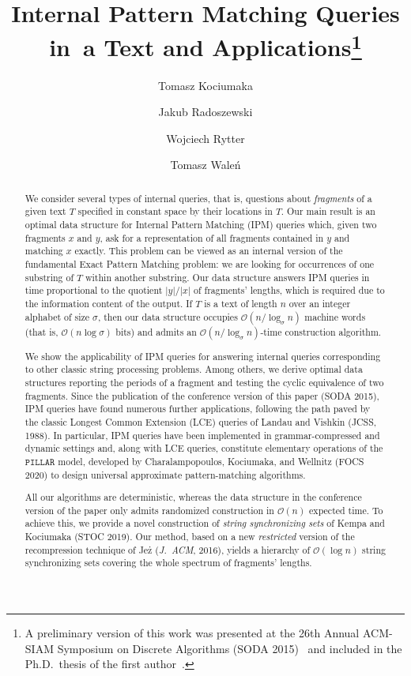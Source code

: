 \documentclass[a4paper]{article}
\title{Internal Pattern Matching Queries in~a Text and Applications\thanks{A preliminary version of this work was presented at the 26th Annual {ACM-SIAM} Symposium on Discrete Algorithms (SODA 2015)~\cite{DBLP:conf/soda/KociumakaRRW15} and included in the Ph.D.\ thesis of the first author~\cite{phd}.}}
\author[1]{Tomasz Kociumaka}
\author[2,3]{Jakub Radoszewski}
\author[2]{Wojciech Rytter}
\author[2]{Tomasz Wale\'n}
\affil[1]{Max Planck Institute for Informatics,  Saarbrücken, Germany}
\affil[ ]{\texttt{tomasz.kociumaka@mpi-inf.mpg.de}}
\affil[2]{University of Warsaw, Warsaw, Poland}
\affil[ ]{\texttt{[jrad, rytter, walen]@mimuw.edu.pl}}
\affil[3]{Samsung R\&D Warsaw, Warsaw, Poland}
\date{\empty}
\theoremstyle{definition}
\theoremstyle{remark}
\newcommand{\pillar}{\ensuremath{\mathtt{PILLAR}}\xspace}
\newcommand{\Oh}{\mathcal{O}}
\begin{document}
\maketitle

\begin{abstract}
We consider several types of internal queries, that is, questions about \emph{fragments} of a given text $T$
specified in constant space by their locations in $T$.
Our main result is an optimal data structure for Internal Pattern Matching (IPM) queries which,
given two fragments $x$ and $y$, ask for a representation of all fragments contained in $y$ and matching $x$ exactly.
This problem can be viewed as an internal version of the fundamental Exact Pattern Matching problem:
we are looking for occurrences of one substring of $T$ within another substring.
Our data structure answers IPM queries in time proportional to the quotient $|y|/|x|$ of fragments' lengths,
which is required due to the information content of the output.
If $T$ is a text of length $n$ over an integer alphabet of size $\sigma$,
then our data structure occupies $\Oh(n/ \log_\sigma n)$ machine words (that is, $\Oh(n\log \sigma)$ bits)
and admits an $\Oh(n/ \log_\sigma n)$-time construction algorithm.

We show the applicability of IPM queries for answering internal queries corresponding to other classic string processing problems.
Among others, we derive optimal data structures reporting the periods of a fragment and testing the cyclic equivalence of two fragments.
Since the publication of the conference version of this paper (SODA 2015), IPM queries
have found numerous further applications, following the path paved by the classic Longest Common Extension (LCE) queries of Landau and Vishkin (JCSS, 1988).
In particular, IPM queries have been implemented in grammar-compressed and dynamic settings
and, along with LCE queries, constitute elementary operations of the \pillar model, developed by Charalampopoulos, Kociumaka, and Wellnitz
(FOCS 2020) to design universal approximate pattern-matching algorithms.

All our algorithms are deterministic, whereas the data structure in the conference version of the paper only admits randomized construction in $\Oh(n)$ expected time.
To achieve this, we provide a novel construction of \emph{string synchronizing sets} of Kempa and Kociumaka (STOC 2019).
Our method, based on a new \emph{restricted} version of the recompression technique of Jeż (\emph{J.\ ACM}, 2016),
yields a hierarchy of $\Oh(\log n)$ string synchronizing sets covering the whole spectrum of fragments' lengths.
\end{abstract}
\end{document}
